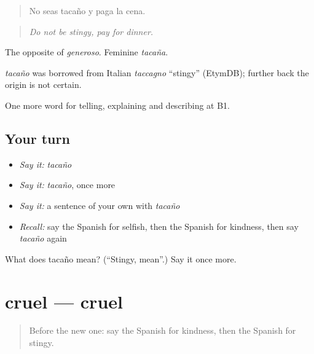 \begin{quote}
No seas tacaño y paga la cena.
\end{quote}

\begin{quote}
\emph{Do not be stingy, pay for dinner.}
\end{quote}

The opposite of \emph{generoso}. Feminine \emph{tacaña}.

\begin{cousinweb}
\emph{tacaño} was borrowed from Italian \emph{taccagno} \textquotedblleft{}stingy\textquotedblright{} (EtymDB); further back the origin is not certain.
\end{cousinweb}

\begin{grammarlens}[title={What you've built}]
One more word for telling, explaining and describing at B1.
\end{grammarlens}

\subsection*{Your turn}
\begin{itemize}
\raggedright
  \item \emph{Say it:} \emph{tacaño}
  \item \emph{Say it:} \emph{tacaño}, once more
  \item \emph{Say it:} a sentence of your own with \emph{tacaño}
  \item \emph{Recall:} say the Spanish for selfish, then the Spanish for kindness, then say \emph{tacaño} again
\end{itemize}

\begin{tcolorbox}[breakable,colback=teal!4,colframe=teal!35!black,title={Before you move on}]
What does tacaño mean? (\textquotedblleft{}Stingy, mean\textquotedblright{}.) Say it once more.
\end{tcolorbox}
\section[cruel]{cruel — cruel}

\label{lesson:ES-C723-cruel}



\begin{quote}
Before the new one: say the Spanish for kindness, then the Spanish for stingy.
\end{quote}

